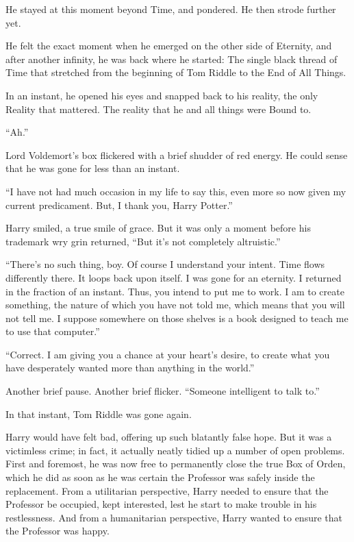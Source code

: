 He stayed at this moment beyond Time, and pondered. He then strode further yet.

He felt the exact moment when he emerged on the other side of Eternity, and after another infinity, he was back where he started: The single black thread of Time that stretched from the beginning of Tom Riddle to the End of All Things.

In an instant, he opened his eyes and snapped back to his reality, the only Reality that mattered. The reality that he and all things were Bound to.
\simpleline

“Ah.”

Lord Voldemort’s box flickered with a brief shudder of red energy. He could sense that he was gone for less than an instant.

“I have not had much occasion in my life to say this, even more so now given my current predicament. But, I thank you, Harry Potter.”

Harry smiled, a true smile of grace. But it was only a moment before his trademark wry grin returned, “But it’s not completely altruistic.”

“There’s no such thing, boy. Of course I understand your intent. Time flows differently there. It loops back upon itself. I was gone for an eternity. I returned in the fraction of an instant. Thus, you intend to put me to work. I am to create something, the nature of which you have not told me, which means that you will not tell me. I suppose somewhere on those shelves is a book designed to teach me to use that computer.”

“Correct. I am giving you a chance at your heart’s desire, to create what you have desperately wanted more than anything in the world.”

Another brief pause. Another brief flicker. “Someone intelligent to talk to.”

In that instant, Tom Riddle was gone again.
\simpleline

Harry would have felt bad, offering up such blatantly false hope. But it was a victimless crime; in fact, it actually neatly tidied up a number of open problems. First and foremost, he was now free to permanently close the true Box of Orden, which he did as soon as he was certain the Professor was safely inside the replacement. From a utilitarian perspective, Harry needed to ensure that the Professor be occupied, kept interested, lest he start to make trouble in his restlessness. And from a humanitarian perspective, Harry wanted to ensure that the Professor was happy.

